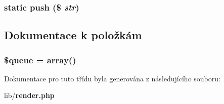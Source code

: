 \subsubsection[{push}]{\setlength{\rightskip}{0pt plus 5cm}static push (\$ {\em str})\hspace{0.3cm}{\ttfamily  [static]}}\label{d0/d02/class_b_queue_a728252eb0d1a948bbf5e8d4524b884f3}


\subsection{Dokumentace k položkám}
\subsubsection[{\$queue}]{\setlength{\rightskip}{0pt plus 5cm}\$queue = array()\hspace{0.3cm}{\ttfamily  [static, private]}}\label{d0/d02/class_b_queue_a4a0b48f6ae2fcb248a4f0288c7c344a6}


Dokumentace pro tuto třídu byla generována z následujícího souboru:\begin{DoxyCompactItemize}
\item 
lib/{\bf render.php}\end{DoxyCompactItemize}
